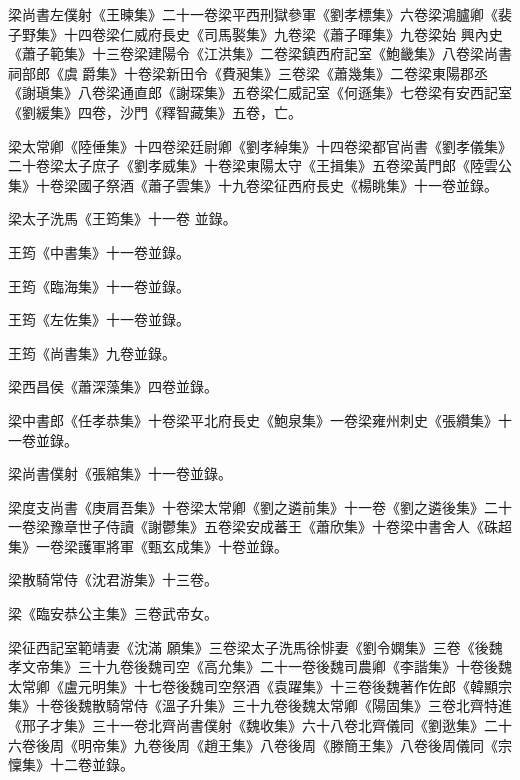 \begin{pinyinscope}
 梁尚書左僕射《王暕集》二十一卷梁平西刑獄參軍《劉孝標集》六卷梁鴻臚卿《裴子野集》十四卷梁仁威府長史《司馬褧集》九卷梁《蕭子暉集》九卷梁始
 興內史《蕭子範集》十三卷梁建陽令《江洪集》二卷梁鎮西府記室《鮑畿集》八卷梁尚書祠部郎《虞爵集》十卷梁新田令《費昶集》三卷梁《蕭幾集》二卷梁東陽郡丞《謝瑱集》八卷梁通直郎《謝琛集》五卷梁仁威記室《何遜集》七卷梁有安西記室《劉緩集》四卷，沙門《釋智藏集》五卷，亡。



 梁太常卿《陸倕集》十四卷梁廷尉卿《劉孝綽集》十四卷梁都官尚書《劉孝儀集》二十卷梁太子庶子《劉孝威集》十卷梁東陽太守《王揖集》五卷梁黃門郎《陸雲公集》十卷梁國子祭酒《蕭子雲集》十九卷梁征西府長史《楊眺集》十一卷並錄。



 梁太子洗馬《王筠集》十一卷
 並錄。



 王筠《中書集》十一卷並錄。



 王筠《臨海集》十一卷並錄。



 王筠《左佐集》十一卷並錄。



 王筠《尚書集》九卷並錄。



 梁西昌侯《蕭深藻集》四卷並錄。



 梁中書郎《任孝恭集》十卷梁平北府長史《鮑泉集》一卷梁雍州刺史《張纘集》十一卷並錄。



 梁尚書僕射《張綰集》十一卷並錄。



 梁度支尚書《庚肩吾集》十卷梁太常卿《劉之遴前集》十一卷《劉之遴後集》二十一卷梁豫章世子侍讀《謝鬱集》五卷梁安成蕃王《蕭欣集》十卷梁中書舍人《硃超集》一卷梁護軍將軍《甄玄成集》十卷並錄。



 梁散騎常侍《沈君游集》十三卷。



 梁《臨安恭公主集》三卷武帝女。



 梁征西記室範靖妻《沈滿
 願集》三卷梁太子洗馬徐悱妻《劉令嫻集》三卷《後魏孝文帝集》三十九卷後魏司空《高允集》二十一卷後魏司農卿《李諧集》十卷後魏太常卿《盧元明集》十七卷後魏司空祭酒《袁躍集》十三卷後魏著作佐郎《韓顯宗集》十卷後魏散騎常侍《溫子升集》三十九卷後魏太常卿《陽固集》三卷北齊特進《邢子才集》三十一卷北齊尚書僕射《魏收集》六十八卷北齊儀同《劉逖集》二十六卷後周《明帝集》九卷後周《趙王集》八卷後周《滕簡王集》八卷後周儀同《宗懍集》十二卷並錄。




\end{pinyinscope}
